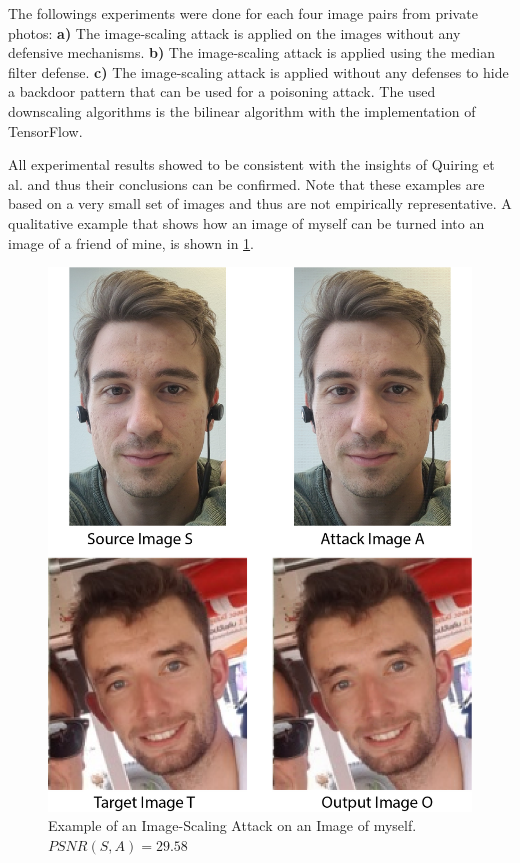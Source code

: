 \documentclass[sigconf]{acmart}
\begin{document}
The followings experiments were done for each four image pairs from private photos:
\textbf{a)} The image-scaling attack is applied on the images without any defensive mechanisms. 
\textbf{b)} The image-scaling attack is applied using the median filter defense.
\textbf{c)} The image-scaling attack is applied without any defenses to hide a backdoor pattern that can be used for a poisoning attack.
The used downscaling algorithms is the bilinear algorithm with the implementation of TensorFlow. 

All experimental results showed to be consistent with the insights of Quiring et al. and thus their conclusions can be confirmed.
Note that these examples are based on a very small set of images and thus are not empirically representative.
A qualitative example that shows how an image of myself can be turned into an image of a friend of mine, is shown in \ref{fig:results}.

\begin{figure}[h]
  \centering
  \includegraphics[width=\linewidth]{img/attackExample.png}
  \caption{Example of an Image-Scaling Attack on an Image of myself. $PSNR(S, A) = 29.58$}
  \Description{}
  \label{fig:results}
\end{figure}
\end{document}
